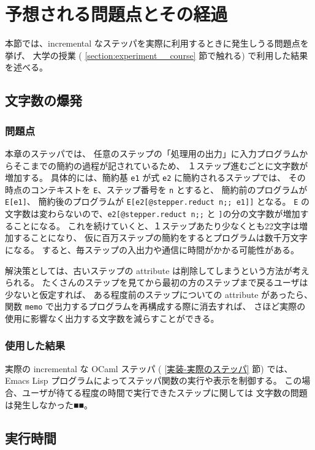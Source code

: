 \section{予想される問題点とその経過}
本節では、incremental なステッパを実際に利用するときに発生しうる問題点を挙げ、
大学の授業 ( \ref{section:experiment__course} 節で触れる) で利用した結果を述べる。

\subsection{文字数の爆発}

\subsubsection{問題点}

本章のステッパでは、
任意のステップの「処理用の出力」に入力プログラムからそこまでの簡約の過程が記されているため、
１ステップ進むごとに文字数が増加する。
具体的には、簡約基 \texttt{e1} が式 \texttt{e2} に簡約されるステップでは、
その時点のコンテキストを \texttt{E}、ステップ番号を \texttt{n} とすると、
簡約前のプログラムが \texttt{E[e1]}、
簡約後のプログラムが \texttt{E[e2[@stepper.reduct n;; e1]]} となる。
\texttt{E} の文字数は変わらないので、\texttt{e2[@stepper.reduct n;;}
と \texttt{]}の分の文字数が増加することになる。
これを続けていくと、１ステップあたり少なくとも22文字は増加することになり、
仮に百万ステップの簡約をするとプログラムは数千万文字になる。
すると、毎ステップの入出力や通信に時間がかかる可能性がある。

解決策としては、古いステップの attribute は削除してしまうという方法が考えられる。
たくさんのステップを見てから最初の方のステップまで戻るユーザは少ないと仮定すれば、
ある程度前のステップについての attribute があったら、
関数 \texttt{memo} で出力するプログラムを再構成する際に消去すれば、
さほど実際の使用に影響なく出力する文字数を減らすことができる。

\subsubsection{使用した結果}

実際の incremental な OCaml ステッパ ( \ref{実装-実際のステッパ} 節) では、
Emacs Lisp プログラムによってステッパ関数の実行や表示を制御する。
この場合、ユーザが待てる程度の時間で実行できたステップに関しては
文字数の問題は発生しなかった■■。

\subsection{実行時間}
\label{予想される問題点-実行時間}

